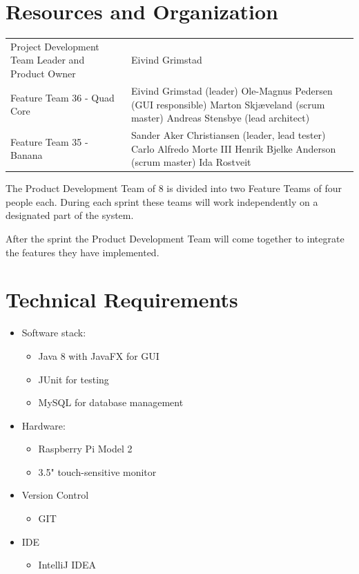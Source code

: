 \documentclass[a4paper,12pt]{article}
\begin{document}
\section{Resources and Organization}
\begin{tabularx}{\textwidth}{p{}p{}}
	Project Development Team Leader and Product Owner & Eivind Grimstad \\
	Feature Team 36 - Quad Core & 
		Eivind Grimstad (leader)\newline
		Ole-Magnus Pedersen (GUI responsible)\newline
		Marton Skjæveland (scrum master)\newline
		Andreas Stensbye (lead architect)\newline
		\\
	Feature Team 35 - Banana & 
		Sander Aker Christiansen (leader, lead tester)\newline
		Carlo Alfredo Morte III\newline
		Henrik Bjelke Anderson (scrum master)\newline
		Ida Rostveit
\end{tabularx}
\newline
\vspace{10px}

The Product Development Team of 8 is divided into two Feature Teams of four people each. During each sprint these teams will work independently on a designated part of the system.

After the sprint the Product Development Team will come together to integrate the features they have implemented.

\section{Technical Requirements}
\begin{itemize}
	\item Software stack:
	\begin{itemize}
		\item Java 8 with JavaFX for GUI
		\item JUnit for testing
		\item MySQL for database management
	\end{itemize}
	\item Hardware:
	\begin{itemize}
		\item Raspberry Pi Model 2
		\item 3.5" touch-sensitive monitor
	\end{itemize}
	\item Version Control
	\begin{itemize}
		\item GIT
	\end{itemize}
	\item IDE
	\begin{itemize}
		\item IntelliJ IDEA
	\end{itemize}
\end{itemize}
\end{document}
